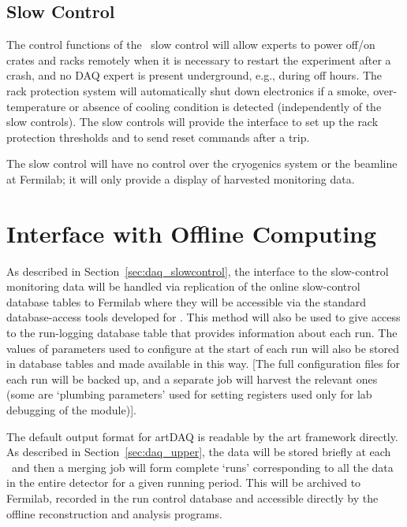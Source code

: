 \subsection{Slow Control}

The control functions of the \LBNE\ slow control will allow experts to
power off/on crates and racks remotely when it is necessary 
to restart the experiment after a crash, and no DAQ expert is present underground, e.g., during off hours.  The rack protection
system will automatically shut
down electronics if a smoke, over-temperature or absence of cooling
condition is detected  (independently of the slow controls).  The slow controls will provide the interface
to set up the rack protection thresholds and to send reset commands
after a trip.

The slow control will have no control over the cryogenics system or the beamline at Fermilab; it will only provide a display of harvested monitoring data.



\section{ Interface with Offline Computing}
\label{sec:daq_offline}


As described in Section~\ref{sec:daq_slowcontrol}, the interface  to
the slow-control monitoring data will be handled via replication of the
online slow-control database tables to Fermilab where they will be
accessible via the standard database-access tools developed for
\LBNE.  This method will also be used to give access to the run-logging
database table that provides information about each run.  The values of
parameters used to configure  at the start of each run will also be
stored in database tables and made available in this way. [The full 
configuration files for each run will be backed up, and a separate job
will harvest the relevant ones  (some are `plumbing parameters' used
for setting registers used only for lab debugging of the module)].

The default output format for artDAQ is readable by the art framework
directly.  As described in Section~\ref{sec:daq_upper}, the data will be
stored briefly at each \COMPARTMENT\ and then a merging job will form
complete `runs' corresponding to all the data in the entire detector
for a given running period.  This will be archived to Fermilab, recorded in the
run control database and accessible directly by the offline
reconstruction and analysis programs.

